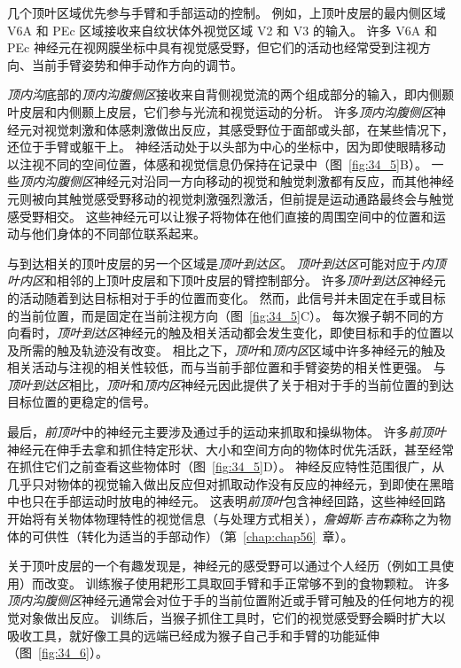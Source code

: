 几个顶叶区域优先参与手臂和手部运动的控制。
例如，上顶叶皮层的最内侧区域 V6A 和 PEc 区域接收来自纹状体外视觉区域 V2 和 V3 的输入。
许多 V6A 和 PEc 神经元在视网膜坐标中具有视觉感受野，但它们的活动也经常受到注视方向、当前手臂姿势和伸手动作方向的调节。


\textit{顶内沟}底部的\textit{顶内沟腹侧区}接收来自背侧视觉流的两个组成部分的输入，即内侧颞叶皮层和内侧颞上皮层，它们参与光流和视觉运动的分析。
许多\textit{顶内沟腹侧区}神经元对视觉刺激和体感刺激做出反应，其感受野位于面部或头部，在某些情况下，还位于手臂或躯干上。
神经活动处于以头部为中心的坐标中，因为即使眼睛移动以注视不同的空间位置，体感和视觉信息仍保持在记录中（图~\ref{fig:34_5}B）。
一些\textit{顶内沟腹侧区}神经元对沿同一方向移动的视觉和触觉刺激都有反应，而其他神经元则被向其触觉感受野移动的视觉刺激强烈激活，但前提是运动通路最终会与触觉感受野相交。
这些神经元可以让猴子将物体在他们直接的周围空间中的位置和运动与他们身体的不同部位联系起来。


与到达相关的顶叶皮层的另一个区域是\textit{顶叶到达区}。
\textit{顶叶到达区}可能对应于\textit{内顶叶内区}和相邻的上顶叶皮层和下顶叶皮层的臂控制部分。
许多\textit{顶叶到达区}神经元的活动随着到达目标相对于手的位置而变化。
然而，此信号并未固定在手或目标的当前位置，而是固定在当前注视方向（图~\ref{fig:34_5}C）。
每次猴子朝不同的方向看时，\textit{顶叶到达区}神经元的触及相关活动都会发生变化，即使目标和手的位置以及所需的触及轨迹没有改变。
相比之下，\textit{顶叶}和\textit{顶内区}区域中许多神经元的触及相关活动与注视的相关性较低，而与当前手部位置和手臂姿势的相关性更强。
与\textit{顶叶到达区}相比，\textit{顶叶}和\textit{顶内区}神经元因此提供了关于相对于手的当前位置的到达目标位置的更稳定的信号。


最后，\textit{前顶叶}中的神经元主要涉及通过手的运动来抓取和操纵物体。
许多\textit{前顶叶}神经元在伸手去拿和抓住特定形状、大小和空间方向的物体时优先活跃，甚至经常在抓住它们之前查看这些物体时（图~\ref{fig:34_5}D）。
神经反应特性范围很广，从几乎只对物体的视觉输入做出反应但对抓取动作没有反应的神经元，到即使在黑暗中也只在手部运动时放电的神经元。
这表明\textit{前顶叶}包含神经回路，这些神经回路开始将有关物体物理特性的视觉信息（与处理方式相关），\textit{詹姆斯$\cdot$吉布森}称之为物体的可供性（转化为适当的手部动作）（第~\ref{chap:chap56}~章）。


关于顶叶皮层的一个有趣发现是，神经元的感受野可以通过个人经历（例如工具使用）而改变。
训练猴子使用耙形工具取回手臂和手正常够不到的食物颗粒。
许多\textit{顶内沟腹侧区}神经元通常会对位于手的当前位置附近或手臂可触及的任何地方的视觉对象做出反应。
训练后，当猴子抓住工具时，它们的视觉感受野会瞬时扩大以吸收工具，就好像工具的远端已经成为猴子自己手和手臂的功能延伸（图~\ref{fig:34_6}）。


